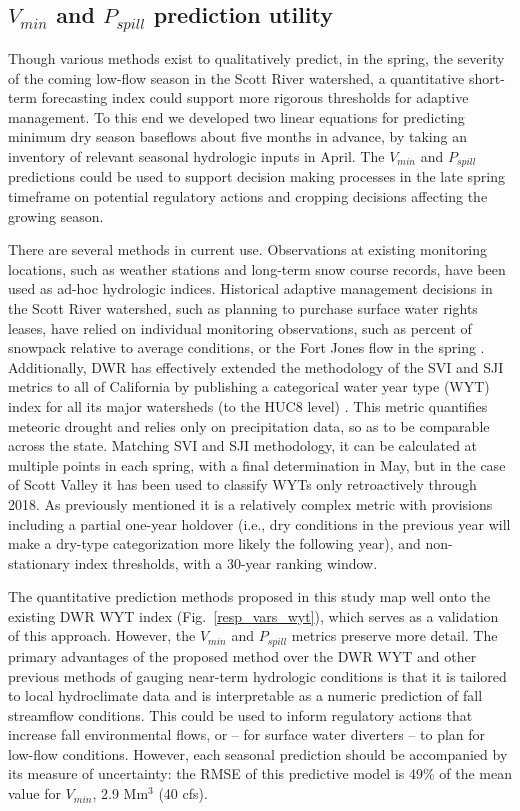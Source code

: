 \documentclass[hess, manuscript]{copernicus}
\begin{document}
\subsection{\texorpdfstring{$V_{min}$ and $P_{spill}$ prediction
utility}{V\_\{min\} and P\_\{spill\} prediction utility}}

Though various methods exist to qualitatively predict, in the spring,
the severity of the coming low-flow season in the Scott River watershed,
a quantitative short-term forecasting index could support more rigorous
thresholds for adaptive management. To this end we developed two linear
equations for predicting minimum dry season baseflows about five months
in advance, by taking an inventory of relevant seasonal hydrologic
inputs in April. The $V_{min}$ and $P_{spill}$ predictions could be
used to support decision making processes in the late spring timeframe
on potential regulatory actions and cropping decisions affecting the
growing season.

There are several methods in current use. Observations at existing
monitoring locations, such as weather stations and long-term snow course
records, have been used as ad-hoc hydrologic indices. Historical
adaptive management decisions in the Scott River watershed, such as
planning to purchase surface water rights leases, have relied on
individual monitoring observations, such as percent of snowpack relative
to average conditions, or the Fort Jones flow in the spring
\citep[e.g.,][]{SRWT2018}. Additionally, DWR has effectively
extended the methodology of the SVI and SJI metrics to all of California
by publishing a categorical water year type (WYT) index for all its
major watersheds (to the HUC8 level) \citep{DWR2021a}. This
metric quantifies meteoric drought and relies only on precipitation
data, so as to be comparable across the state. Matching SVI and SJI
methodology, it can be calculated at multiple points in each spring,
with a final determination in May, but in the case of Scott Valley it
has been used to classify WYTs only retroactively through 2018. As
previously mentioned it is a relatively complex metric with provisions
including a partial one-year holdover (i.e., dry conditions in the
previous year will make a dry-type categorization more likely the
following year), and non-stationary index thresholds, with a 30-year
ranking window.

The quantitative prediction methods proposed in this study map well onto
the existing DWR WYT index (Fig.~\ref{resp_vars_wyt}), which serves
as a validation of this approach. However, the $V_{min}$ and
$P_{spill}$ metrics preserve more detail. The primary advantages of
the proposed method over the DWR WYT and other previous methods of
gauging near-term hydrologic conditions is that it is tailored to local
hydroclimate data and is interpretable as a numeric prediction of fall
streamflow conditions. This could be used to inform regulatory actions
that increase fall environmental flows, or -- for surface water
diverters -- to plan for low-flow conditions. However, each seasonal
prediction should be accompanied by its measure of uncertainty: the RMSE
of this predictive model is 49\% of the mean value for $V_{min}$, 2.9
Mm$^\mathrm{3}$ (40 cfs).
\end{document}
